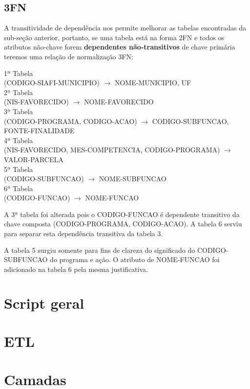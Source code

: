 \documentclass[12pt]{article}
\begin{document}
	\subsection{3FN}
	\label{sec:3fn}
	
	A transitividade de dependência nos permite melhorar as tabelas encontradas da sub-seção anterior, portanto, se uma tabela está na forma 2FN e todos os atributos não-chave forem \textbf{dependentes não-transitivos} de chave primária teremos uma relação de normalização 3FN:
	
	\begin{center}
		1$ª$ Tabela \\ (CODIGO-SIAFI-MUNICIPIO) $\rightarrow$ NOME-MUNICIPIO, UF \\
		2$ª$ Tabela \\
		(NIS-FAVORECIDO) $\rightarrow$ NOME-FAVORECIDO \\
		3$ª$ Tabela \\
		(CODIGO-PROGRAMA, CODIGO-ACAO) $\rightarrow$ CODIGO-SUBFUNCAO, FONTE-FINALIDADE \\
		4$ª$ Tabela \\
		(NIS-FAVORECIDO, MES-COMPETENCIA, CODIGO-PROGRAMA) $\rightarrow$ VALOR-PARCELA \\
		5$ª$ Tabela \\
		(CODIGO-SUBFUNCAO) $\rightarrow$ NOME-SUBFUNCAO \\
		6$ª$ Tabela \\
		(CODIGO-FUNCAO) $\rightarrow$ NOME-FUNCAO 
		\label{tab:3fn} 
	\end{center} 
	
		A 3$ª$ tabela foi alterada pois o CODIGO-FUNCAO é dependente transitivo da chave composta (CODIGO-PROGRAMA, CODIGO-ACAO). A tabela 6 serviu para separar esta dependência transitiva da tabela 3. 
		
		A tabela 5 surgiu somente para fins de clareza do significado do CODIGO-SUBFUNCAO do programa e ação. O atributo de NOME-FUNCAO foi adicionado na tabela 6 pela mesma justificativa.
	
	\section{Script geral}
	\label{sec:scriptg}
	
	\section{ETL}
	\label{sec:etl}
	
	\section{Camadas}
	\label{sec:camadas}
	
\end{document}
